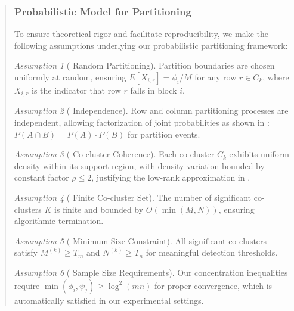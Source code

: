 \documentclass{ar2rc}
\theoremstyle{definition}
\theoremstyle{remark} %
\newtheorem*{assumption*}{Assumption}
\begin{document}
\begin{quote}
  \subsubsection*{ Probabilistic Model for Partitioning}

  To ensure theoretical rigor and facilitate reproducibility, we make the following assumptions underlying our probabilistic partitioning framework:

  \begin{assumption*}[ Random Partitioning]
    Partition boundaries are chosen uniformly at random, ensuring $E[X_{i,r}] = \phi_i/M$ for any row $r \in C_k$, where $X_{i,r}$ is the indicator that row $r$ falls in block $i$.
  \end{assumption*}

  \begin{assumption*}[ Independence]
    Row and column partitioning processes are independent, allowing factorization of joint probabilities as shown in : $P(A \cap B) = P(A) \cdot P(B)$ for partition events.
  \end{assumption*}

  \begin{assumption*}[ Co-cluster Coherence]
    Each co-cluster $C_k$ exhibits uniform density within its support region, with density variation bounded by constant factor $\rho \leq 2$, justifying the low-rank approximation in .
  \end{assumption*}

  \begin{assumption*}[ Finite Co-cluster Set]
    The number of significant co-clusters $K$ is finite and bounded by $O(\min(M,N))$, ensuring algorithmic termination.
  \end{assumption*}

  \begin{assumption*}[ Minimum Size Constraint]
    All significant co-clusters satisfy $M^{(k)} \geq T_m$ and $N^{(k)} \geq T_n$ for meaningful detection thresholds.
  \end{assumption*}

  \begin{assumption*}[ Sample Size Requirements]
    Our concentration inequalities require $\min(\phi_i, \psi_j) \geq \log^2(mn)$ for proper convergence, which is automatically satisfied in our experimental settings.
  \end{assumption*}



\end{quote}
\end{document}
